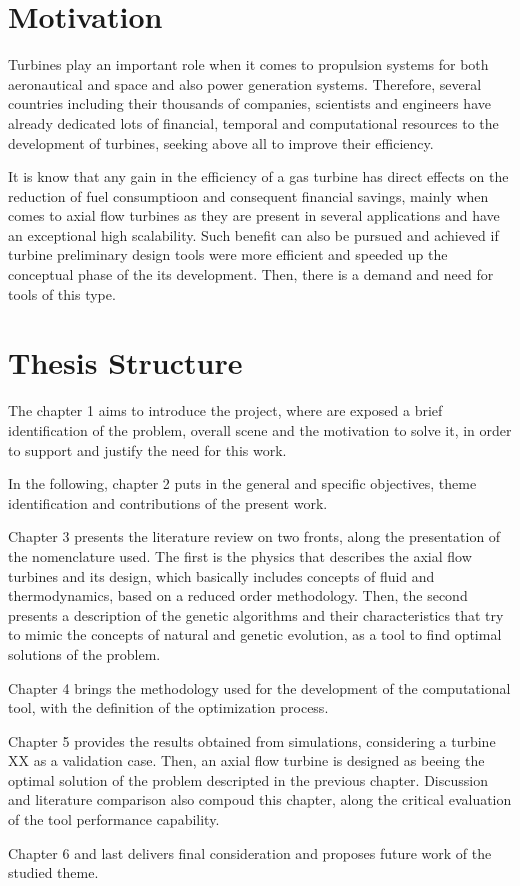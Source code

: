 \section{Motivation}
Turbines play an important role when it comes to propulsion systems for both aeronautical and space and also power generation systems. Therefore, several countries including their thousands of companies, scientists and engineers have already dedicated lots of financial, temporal and computational resources to the development of turbines, seeking above all to improve their efficiency.

It is know that any gain in the efficiency of a gas turbine has direct effects on the reduction of fuel consumptioon and consequent financial savings, mainly when comes to axial flow turbines as they are present in several applications and have an exceptional high scalability. Such benefit can also be pursued and achieved if turbine preliminary design tools were more efficient and speeded up the conceptual phase of the its development. Then, there is a demand and need for tools of this type. 

\section{Thesis Structure}
The chapter 1 aims to introduce the project, where are exposed a brief identification of the problem, overall scene and the motivation to solve it, in order to support and justify the need for this work.

In the following, chapter 2 puts in the general and specific objectives, theme identification and contributions of the present work.

Chapter 3 presents the literature review on two fronts, along the presentation of the nomenclature used. The first is the physics that describes the axial flow turbines and its design, which basically includes concepts of fluid and thermodynamics, based on a reduced order methodology. Then, the second presents a description of the genetic algorithms and their characteristics that try to mimic the concepts of natural and genetic evolution, as a tool to find optimal solutions of the problem.

Chapter 4 brings the methodology used for the development of the computational tool, with the definition of the optimization process. 

Chapter 5 provides the results obtained from simulations, considering a turbine XX as a validation case. Then, an axial flow turbine is designed as beeing the optimal solution of the problem descripted in the previous chapter. Discussion and literature comparison also compoud this chapter, along the critical evaluation of the tool performance capability.

Chapter 6 and last delivers final consideration and proposes future work of the studied theme.
